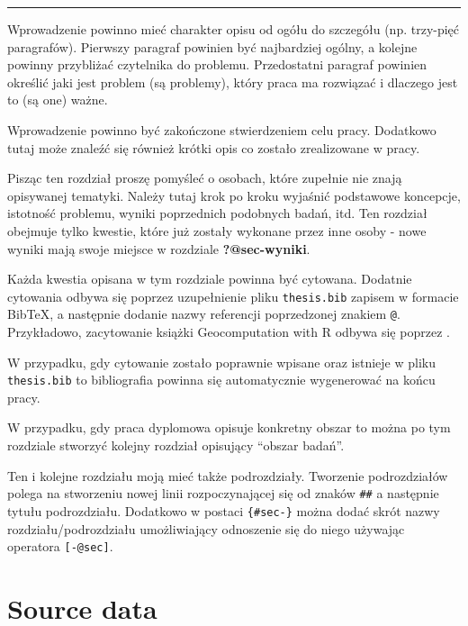 \documentclass{amuthesis}
\begin{document}
\begin{center}\rule{0.5\linewidth}{0.5pt}\end{center}

Wprowadzenie powinno mieć charakter opisu od ogółu do szczegółu (np.
trzy-pięć paragrafów). Pierwszy paragraf powinien być najbardziej
ogólny, a kolejne powinny przybliżać czytelnika do problemu.
Przedostatni paragraf powinien określić jaki jest problem (są problemy),
który praca ma rozwiązać i dlaczego jest to (są one) ważne.

Wprowadzenie powinno być zakończone stwierdzeniem celu pracy. Dodatkowo
tutaj może znaleźć się również krótki opis co zostało zrealizowane w
pracy.

Pisząc ten rozdział proszę pomyśleć o osobach, które zupełnie nie znają
opisywanej tematyki. Należy tutaj krok po kroku wyjaśnić podstawowe
koncepcje, istotność problemu, wyniki poprzednich podobnych badań, itd.
Ten rozdział obejmuje tylko kwestie, które już zostały wykonane przez
inne osoby - nowe wyniki mają swoje miejsce w rozdziale
\textbf{?@sec-wyniki}.

Każda kwestia opisana w tym rozdziale powinna być cytowana. Dodatnie
cytowania odbywa się poprzez uzupełnienie pliku \texttt{thesis.bib}
zapisem w formacie BibTeX, a następnie dodanie nazwy referencji
poprzedzonej znakiem \texttt{@}. Przykładowo, zacytowanie książki
Geocomputation with R odbywa się poprzez
\autocite{lovelace_geocomputation_2019}.

W przypadku, gdy cytowanie zostało poprawnie wpisane oraz istnieje w
pliku \texttt{thesis.bib} to bibliografia powinna się automatycznie
wygenerować na końcu pracy.

W przypadku, gdy praca dyplomowa opisuje konkretny obszar to można po
tym rozdziale stworzyć kolejny rozdział opisujący ``obszar badań''.

Ten i kolejne rozdziału moją mieć także podrozdziały. Tworzenie
podrozdziałów polega na stworzeniu nowej linii rozpoczynającej się od
znaków \texttt{\#\#} a następnie tytułu podrozdziału. Dodatkowo w
postaci \texttt{\{\#sec-\}} można dodać skrót nazwy
rozdziału/podrozdziału umożliwiający odnoszenie się do niego używając
operatora \texttt{{[}-@sec{]}}.


\hypertarget{sec-data}{%
\chapter{Source data}\label{sec-data}}
\end{document}
